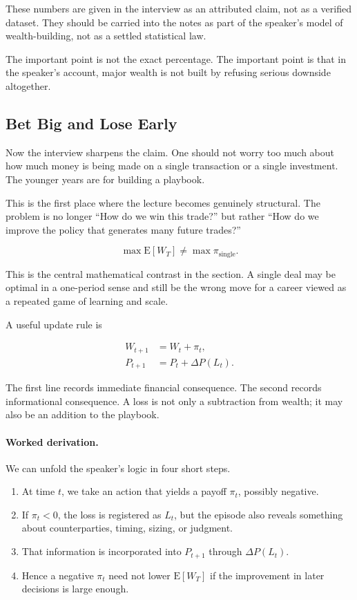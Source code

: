 \begin{remark}
These numbers are given in the interview as an attributed claim, not as a verified dataset. They should be carried into the notes as part of the speaker's model of wealth-building, not as a settled statistical law.
\end{remark}

The important point is not the exact percentage. The important point is that in the speaker's account, major wealth is not built by refusing serious downside altogether.

\subsection{Bet Big and Lose Early}

Now the interview sharpens the claim. One should not worry too much about how much money is being made on a single transaction or a single investment. The younger years are for building a playbook.

This is the first place where the lecture becomes genuinely structural. The problem is no longer ``How do we win this trade?'' but rather ``How do we improve the policy that generates many future trades?''

\begin{equation}
\max \mathrm{E}[W_T] \neq \max \pi_{\mathrm{single}}.
\end{equation}

This is the central mathematical contrast in the section. A single deal may be optimal in a one-period sense and still be the wrong move for a career viewed as a repeated game of learning and scale.

A useful update rule is

\begin{align}
W_{t+1} &= W_t + \pi_t,\\
P_{t+1} &= P_t + \Delta P(L_t).
\end{align}

The first line records immediate financial consequence. The second records informational consequence. A loss is not only a subtraction from wealth; it may also be an addition to the playbook.

\paragraph{Worked derivation.}
We can unfold the speaker's logic in four short steps.
\begin{enumerate}
\item At time \(t\), we take an action that yields a payoff \(\pi_t\), possibly negative.
\item If \(\pi_t<0\), the loss is registered as \(L_t\), but the episode also reveals something about counterparties, timing, sizing, or judgment.
\item That information is incorporated into \(P_{t+1}\) through \(\Delta P(L_t)\).
\item Hence a negative \(\pi_t\) need not lower \(\mathrm{E}[W_T]\) if the improvement in later decisions is large enough.
\end{enumerate}

